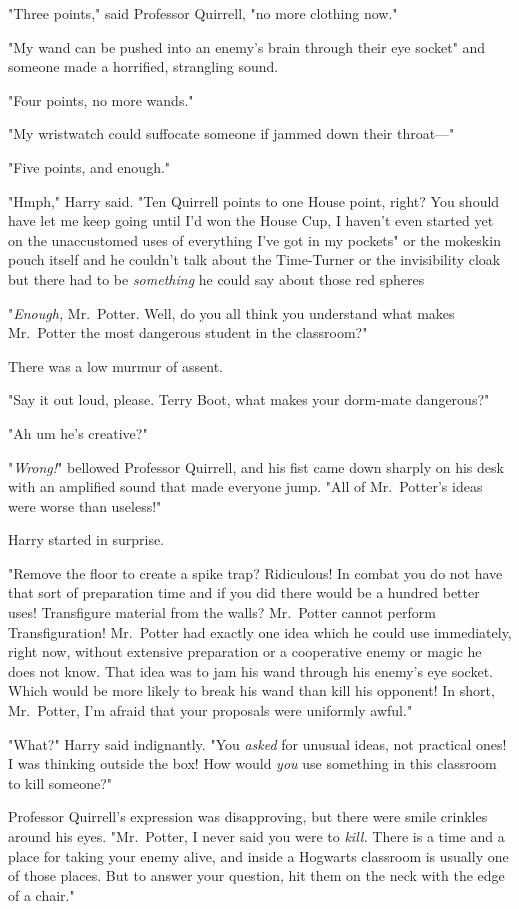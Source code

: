 "Three points," said Professor Quirrell, "no more clothing now."

"My wand can be pushed into an enemy's brain through their eye socket" and
someone made a horrified, strangling sound.

"Four points, no more wands."

"My wristwatch could suffocate someone if jammed down their throat—"

"Five points, and enough."

"Hmph," Harry said. "Ten Quirrell points to one House point, right? You should
have let me keep going until I'd won the House Cup, I haven't even started yet
on the unaccustomed uses of everything I've got in my pockets" or the mokeskin
pouch itself and he couldn't talk about the Time-Turner or the invisibility
cloak but there had to be \emph{something} he could say about those red
spheres{\el}

"\emph{Enough,} Mr.~Potter. Well, do you all think you understand what makes
Mr.~Potter the most dangerous student in the classroom?"

There was a low murmur of assent.

"Say it out loud, please. Terry Boot, what makes your dorm-mate dangerous?"

"Ah{\el} um{\el} he's creative?"

"\emph{Wrong!}" bellowed Professor Quirrell, and his fist came down sharply on
his desk with an amplified sound that made everyone jump. "All of Mr.~Potter's
ideas were worse than useless!"

Harry started in surprise.

"Remove the floor to create a spike trap? Ridiculous! In combat you do not have
that sort of preparation time and if you did there would be a hundred better
uses! Transfigure material from the walls? Mr.~Potter cannot perform
Transfiguration! Mr.~Potter had exactly one idea which he could use
immediately, right now, without extensive preparation or a cooperative enemy or
magic he does not know. That idea was to jam his wand through his enemy's eye
socket. Which would be more likely to break his wand than kill his opponent! In
short, Mr.~Potter, I'm afraid that your proposals were uniformly awful."

"What?" Harry said indignantly. "You \emph{asked} for unusual ideas, not
practical ones! I was thinking outside the box! How would \emph{you} use
something in this classroom to kill someone?"

Professor Quirrell's expression was disapproving, but there were smile crinkles
around his eyes. "Mr.~Potter, I never said you were to \emph{kill.} There is a
time and a place for taking your enemy alive, and inside a Hogwarts classroom
is usually one of those places. But to answer your question, hit them on the
neck with the edge of a chair."

